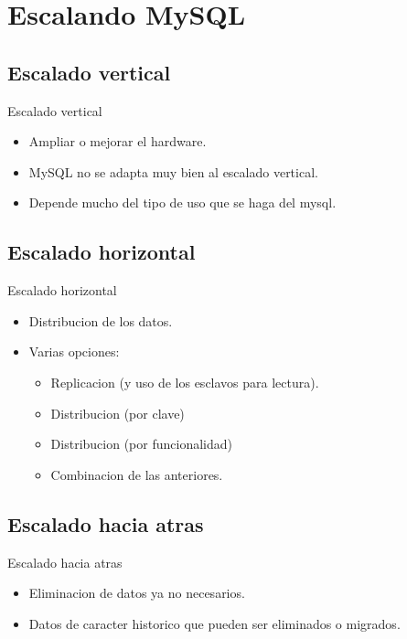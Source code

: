 \section{Escalando MySQL}

\subsection{Escalado vertical}
\begin{frame}{Escalado vertical}
  \begin{itemize}
    \item Ampliar o mejorar el hardware.
    \item MySQL no se adapta muy bien al escalado vertical.
    \item Depende mucho del tipo de uso que se haga del mysql.
  \end{itemize}
\end{frame}

\subsection{Escalado horizontal}
\begin{frame}{Escalado horizontal}
  \begin{itemize}
    \item Distribucion de los datos.
    \item Varias opciones:
    \begin{itemize}
      \item Replicacion (y uso de los esclavos para lectura).
      \item Distribucion (por clave)
      \item Distribucion (por funcionalidad)
      \item Combinacion de las anteriores.
    \end{itemize}
  \end{itemize}
\end{frame}

\subsection{Escalado hacia atras}
\begin{frame}{Escalado hacia atras}
  \begin{itemize}
    \item Eliminacion de datos ya no necesarios.
    \item Datos de caracter historico que pueden ser eliminados o migrados.
  \end{itemize}
\end{frame}

